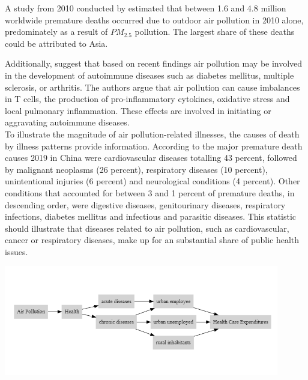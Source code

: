 \documentclass[
]{article}
\begin{document}
	A study from 2010 conducted by \cite{LEL2015} estimated that between 1.6 and 4.8 million worldwide premature deaths occurred due to outdoor air pollution in 2010 alone, predominately as a result of $PM_{2.5}$ pollution. The largest share of these deaths could be attributed to Asia. 
	
	Additionally, \cite{zhao2019emerging} suggest that based on recent findings air pollution may be involved in the development of autoimmune diseases such as diabetes mellitus, multiple sclerosis, or arthritis. The authors argue that air pollution can cause imbalances in T cells, the production of pro-inflammatory cytokines, oxidative stress and local pulmonary inflammation. These effects are involved in initiating or aggravating autoimmune diseases. \\ 
	
	To illustrate the magnitude of air pollution-related illnesses, the causes of death by illness patterns provide information. According to \cite{who_nodate} the major premature death causes 2019 in China were cardiovascular diseases totalling 43 percent, followed by malignant neoplasms (26 percent), respiratory diseases (10 percent), unintentional injuries (6 percent) and neurological conditions (4 percent). Other conditions that accounted for between 3 and 1 percent of premature deaths, in descending order, were digestive diseases, genitourinary diseases, respiratory infections, diabetes mellitus and infectious and parasitic diseases. This statistic should illustrate that diseases related to air pollution, such as cardiovascular, cancer or respiratory diseases, make up for an substantial share of public health issues. \\ 
	
	\begin{center}
		\includegraphics[width=0.9\textwidth]{DAG_true.png} 
		\label{fig:dag}
	\end{center}
\end{document}
